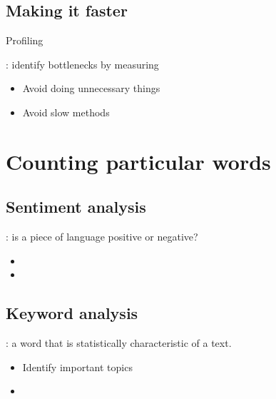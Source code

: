 \documentclass[aspectratio=169,usenames,dvipsnames]{beamer}
\begin{document}
\subsection{Making it faster}
\frame{\tableofcontents[currentsection]}
\begin{frame}{Profiling}
	\begin{definition}
		: identify bottlenecks by measuring
	\end{definition}

	\begin{itemize}
		\item Avoid doing unnecessary things
		\item Avoid slow methods
	\end{itemize}
\end{frame}

\section{Counting particular words}
\subsection{Sentiment analysis}
\frame{\tableofcontents[currentsection]}

\begin{frame}{}
	\begin{definition}
        : 
            is a piece of language positive or negative?
	\end{definition}

	\begin{itemize}
		\item 
		\item 
	\end{itemize}

\end{frame}

\subsection{Keyword analysis}
\begin{frame}{}
	\begin{definition}
		: a word that is statistically characteristic of a text.
	\end{definition}

	\begin{itemize}
		\item Identify important topics
		\item 
	\end{itemize}

\end{frame}
\end{document}

